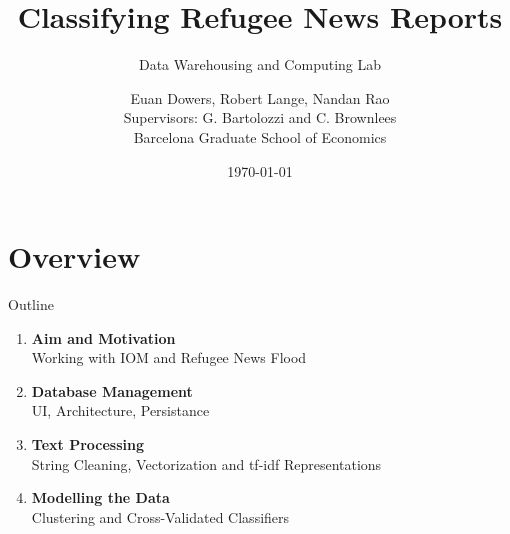 \documentclass{beamer}
\begin{document}
\title{Classifying Refugee News Reports}
\subtitle{Data Warehousing and Computing Lab}

\author{Euan Dowers, Robert Lange, Nandan Rao \\ Supervisors: G. Bartolozzi and C. Brownlees \\ Barcelona Graduate School of Economics}
\date{\today}



\begin{frame}
\titlepage
\end{frame}

\section*{Overview}

\begin{frame}{Outline}
\nocite{*}
\begin{enumerate}
	\item \textbf{Aim and Motivation}\\
		\small{Working with IOM and Refugee News Flood}
	\item \textbf{Database Management}\\
	    \small{UI, Architecture, Persistance}\\
	\item \textbf{Text Processing}\\
	    \small{String Cleaning, Vectorization and tf-idf Representations}
	\item \textbf{Modelling the Data} \\
	    \small{Clustering and Cross-Validated Classifiers}  
\end{enumerate}	

\end{frame}
\end{document}
